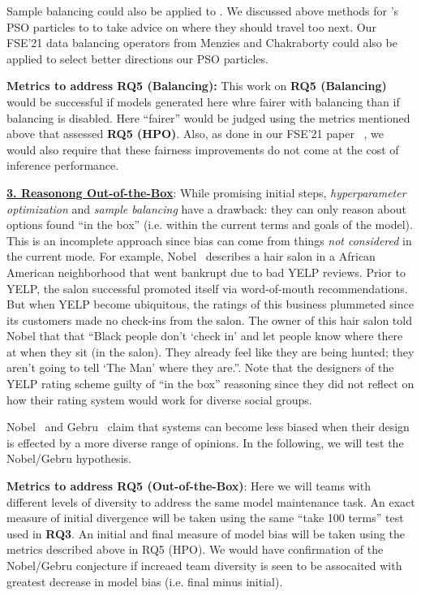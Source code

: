 Sample balancing could also be applied to .
We discussed above methods for {\IT}'s PSO 
 particles to to take advice
 on where they should travel too next. Our FSE'21  data balancing operators 
 from  Menzies and Chakraborty could also be applied to select better directions
 our PSO particles.

   {\bf   Metrics to address RQ5 (Balancing): } 
    This work on {\bf RQ5 (Balancing)} would be successful if     models generated here whre fairer with balancing than if balancing
 is disabled. Here ``fairer'' would be judged using the metrics
 mentioned above that  assessed {\bf RQ5 (HPO)}. Also, as done in our FSE'21 paper~\cite{fse21} , we would also require that these
 fairness improvements do not come at the cost of inference performance.
 

\noindent\underline{\bf 3. Reasonong Out-of-the-Box}: 
While promising initial steps, {\em hyperparameter optimization}
 and {\em sample balancing}   have   a drawback: they can only reason about  options   found ``in the box'' (i.e. within the current terms and goals of the model).
 This is an incomplete approach since bias can come from things {\em not considered} in the current mode.  For  example,
 Nobel~\cite{noble2018algorithms}   describes a hair salon in a   African American neighborhood that went bankrupt due to bad YELP reviews.  
Prior to YELP, the  salon successful promoted itself    via word-of-mouth recommendations. But when   YELP become ubiquitous, the   ratings of this business plummeted since its customers made no check-ins from the salon.    
The owner of this hair salon told Nobel that   that ``Black people don't `check in' and let people know where there at when they sit (in the salon). They already feel like they are being hunted; they aren't going to tell `The Man' where they are.''.   Note that the designers of the YELP rating scheme guilty of ``in the box'' reasoning since they
did not reflect on how their rating system would work for diverse social groups.

 

Nobel~\cite{noble2018algorithms} and Gebru~\cite{gebru21} claim that systems can become
less biased when their design is effected by a more diverse range of opinions.
In the following, we will test the Nobel/Gebru hypothesis.

{\bf Metrics to address RQ5 (Out-of-the-Box)}: 
Here we will teams with different levels of
diversity to address the same model maintenance task. An exact measure of initial divergence
will be taken using the same ``take 100 terms'' test used in {\bf RQ3}. An
initial and final measure of model bias will be taken using the 
metrics described above in  RQ5 (HPO). We would have confirmation of the 
Nobel/Gebru conjecture if increaed team diversity is seen to be assocaited with greatest
decrease in model bias (i.e. final minus initial).
 
